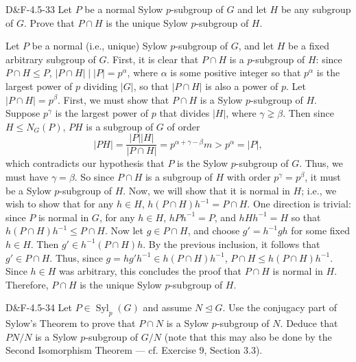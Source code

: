 \documentclass{article}
\begin{document}
	\begin{prb}{D\&F-4.5-33}
		Let $P$ be a normal Sylow $p$-subgroup of $G$ and let $H$ be any subgroup of $G$. Prove that $P \cap H$ is the unique Sylow $p$-subgroup of $H$. 
	\end{prb}
	Let $P$ be a normal (i.e., unique) Sylow $p$-subgroup of $G$, and let $H$ be a fixed arbitrary subgroup of $G$. First, it is clear that $P \cap H$ is a $p$-subgroup of $H$: since $P \cap H \leq P$, $|P \cap H| \mid |P| = p^{\alpha}$, where $\alpha$ is some positive integer so that $p^{\alpha}$ is the largest power of $p$ dividing $|G|$, so that $|P \cap H|$ is also a power of $p$. Let $|P \cap H| = p^{\beta}$. First, we must show that $P\cap H$ is a Sylow $p$-subgroup of $H$. Suppose $p^{\gamma}$ is the largest power of $p$ that divides $|H|$, where $\gamma \gneq \beta$. Then since $H \leq N_{G}(P)$, $PH$ is a subgroup of $G$ of order 
	\begin{equation*}
		|PH| = \frac{|P||H|}{|P \cap H|} = p^{\alpha + \gamma - \beta}m > p^{\alpha} = |P|, 
	\end{equation*}
	which contradicts our hypothesis that $P$ is the Sylow $p$-subgroup of $G$. Thus, we must have $\gamma = \beta$. So since $P \cap H$ is a subgroup of $H$ with order $p^{\gamma} = p^{\beta}$, it must be a Sylow $p$-subgroup of $H$. Now, we will show that it is normal in $H$; i.e., we wish to show that for any $h \in H$, $h(P \cap H)h^{-1} = P \cap H$. One direction is trivial: since $P$ is normal in $G$, for any $h \in H$, $hPh^{-1} = P$, and $hHh^{-1} = H$ so that $h(P \cap H)h^{-1} \leq P \cap H$. Now let $g \in P \cap H$, and choose $g' = h^{-1}gh$ for some fixed $h \in H$. Then $g' \in h^{-1}(P \cap H)h$. By the previous inclusion, it follows that $g' \in P \cap H$. Thus, since $g = hg'h^{-1} \in h(P \cap H)h^{-1}$, $P \cap H \leq h(P \cap H)h^{-1}$. Since $h \in H$ was arbitrary, this concludes the proof that $P \cap H$ is normal in $H$. Therefore, $P \cap H$ is the unique Sylow $p$-subgroup of $H$. 
	
	\begin{prb}{D\&F-4.5-34}
		Let $P \in \operatorname{Syl}_{p}(G)$ and assume $N \trianglelefteq G$. Use the conjugacy part of Sylow's Theorem to prove that $P \cap N$ is a Sylow $p$-subgroup of $N$. Deduce that $PN/N$ is a Sylow $p$-subgroup of $G/N$ (note that this may also be done by the Second Isomorphism Theorem --- cf. Exercise 9, Section 3.3). 
	\end{prb}
	
\end{document}
